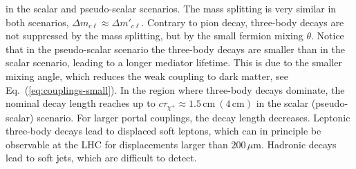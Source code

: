 \documentclass[nofootinbib,prd,aps,superscriptaddress,preprintnumbers]{revtex4}
\begin{document}
in the scalar and pseudo-scalar scenarios. The mass splitting is very similar in both scenarios, $\Delta m_{c\ell}\approx \Delta m'_{c\ell}$. Contrary to pion decay, three-body decays are not suppressed by the mass splitting, but by the small fermion mixing $\theta$. Notice that in the pseudo-scalar scenario the three-body decays are smaller than in the scalar scenario, leading to a longer mediator lifetime. This is due to the smaller mixing angle, which reduces the weak coupling to dark matter, see Eq.~(\ref{eq:couplings-small}). In the region where three-body decays dominate, the nominal decay length reaches up to $c\tau_{\chi^+}\approx 1.5\,\text{cm}\ (4\,\text{cm})$ in the scalar (pseudo-scalar) scenario. For larger portal couplings, the decay length decreases. Leptonic three-body decays lead to displaced soft leptons, which can in principle be observable at the LHC for displacements larger than $200\,\mu\text{m}$. Hadronic decays lead to soft jets, which are difficult to detect.
\end{document}
